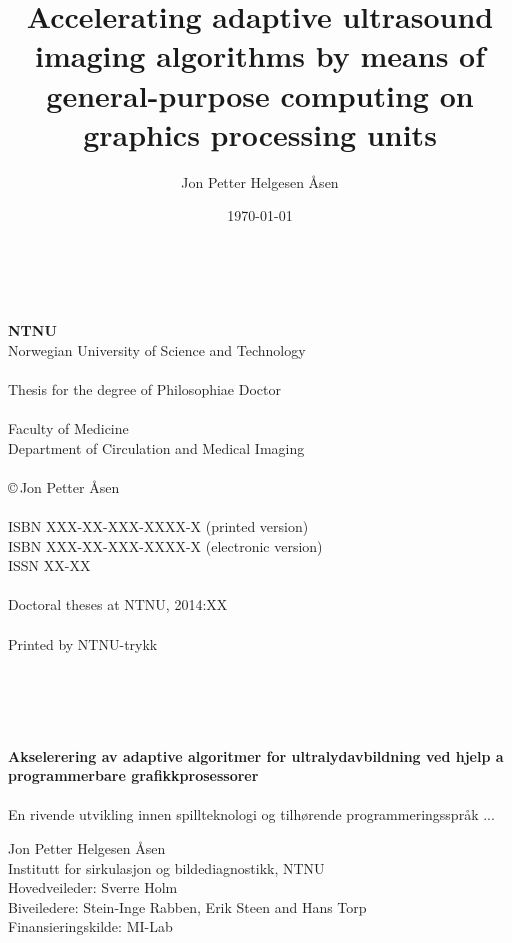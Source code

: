 \documentclass[10pt,b5paper,twoside]{book}
\author{Jon Petter Helgesen \AA{}sen}
\title{%
Accelerating adaptive ultrasound imaging algorithms by means of general-purpose computing on graphics processing units 
\vspace{0.5cm}}
\begin{document}
\date{\today}
\pagestyle{empty} \maketitle

\newpage%

\renewcommand{\thepage}{\roman{page}}%

~\\
\vspace{10.0cm}
~\\
{\bf NTNU}
\\
Norwegian University of Science and Technology\\
\\
Thesis for the degree of Philosophiae Doctor\\
\\
Faculty of Medicine\\
Department of Circulation and Medical Imaging\\
\\
\copyright\,Jon Petter \AA{}sen\\
\\
ISBN XXX-XX-XXX-XXXX-X (printed version)\\
ISBN XXX-XX-XXX-XXXX-X (electronic version)\\
ISSN XX-XX\\
\\
Doctoral theses at NTNU, 2014:XX\\
\\
Printed by NTNU-trykk

~\\
\newpage
~\\%
~\\%
~\\
\noindent\large 
\textbf{Akselerering av adaptive algoritmer for ultralydavbildning ved hjelp a programmerbare grafikkprosessorer}
\\\\%
\normalsize
En rivende utvikling innen spillteknologi og tilh\o{}rende programmeringsspr\aa{}k ...

\vspace{0.3cm}
\noindent Jon Petter Helgesen \AA{}sen\\
Institutt for sirkulasjon og bildediagnostikk, NTNU\\
Hovedveileder: Sverre Holm\\ 
Biveiledere: Stein-Inge Rabben, Erik Steen and Hans Torp\\
Finansieringskilde: MI-Lab
\end{document}
